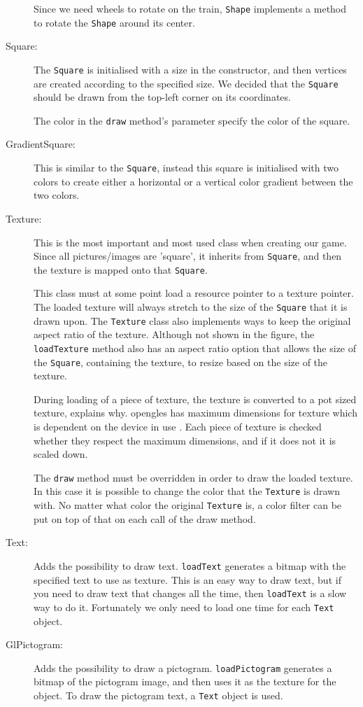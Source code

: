 \begin{description}
Since we need wheels to rotate on the train, \lstinline|Shape| implements a method to rotate the \lstinline|Shape| around its center.

\item[Square:] The \lstinline|Square| is initialised with a size in the constructor, and then vertices are created according to the specified size. We decided that the \lstinline|Square| should be drawn from the top-left corner on its coordinates.

The color in the \lstinline|draw| method's parameter specify the color of the square.

\item[GradientSquare:] This is similar to the \lstinline|Square|, instead this square is initialised with two colors to create either a horizontal or a vertical color gradient between the two colors.

\item[Texture:] This is the most important and most used class when creating our game. Since all pictures/images are 'square', it inherits from \lstinline|Square|, and then the texture is mapped onto that \lstinline|Square|.

This class must at some point load a resource pointer to a texture pointer. The loaded texture will always stretch to the size of the \lstinline|Square| that it is drawn upon. The \lstinline|Texture| class also implements ways to keep the original aspect ratio of the texture. Although not shown in the figure, the \lstinline|loadTexture| method also has an aspect ratio option that allows the size of the \lstinline|Square|, containing the texture, to resize based on the size of the texture.

During loading of a piece of texture, the texture is converted to a \ac{pot} sized texture,  explains why. \ac{opengles} has maximum dimensions for texture which is dependent on the device in use \citep{glutils}. Each piece of texture is checked whether they respect the maximum dimensions, and if it does not it is scaled down.

The \lstinline|draw| method must be overridden in order to draw the loaded texture. In this case it is possible to change the color that the \lstinline|Texture| is drawn with. No matter what color the original \lstinline|Texture| is, a color filter can be put on top of that on each call of the draw method.

\item[Text:] Adds the possibility to draw text. \lstinline|loadText| generates a bitmap with the specified text to use as texture. This is an easy way to draw text, but if you need to draw text that changes all the time, then \lstinline|loadText| is a slow way to do it. Fortunately we only need to load one time for each \lstinline|Text| object.

\item[GlPictogram:] Adds the possibility to draw a pictogram. \lstinline|loadPictogram| generates a bitmap of the pictogram image, and then uses it as the texture for the object. To draw the pictogram text, a \lstinline|Text| object is used.
\end{description}

